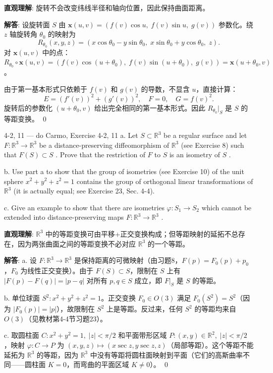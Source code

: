 \begin{solution}
\textbf{直观理解}: 旋转不会改变纬线半径和轴向位置，因此保持曲面距离。

\textbf{解答}: 设旋转面 $S$ 由 $\mathbf{x}(u,v) = (f(v)\cos u,\;f(v)\sin u,\;g(v))$ 参数化。绕 $z$ 轴旋转角 $\theta_0$ 的映射为
\[
R_{\theta_0}(x,y,z) = (x\cos\theta_0-y\sin\theta_0,\;x\sin\theta_0+y\cos\theta_0,\;z).
\]
对 $\mathbf{x}(u,v)$ 中的点：$R_{\theta_0}\circ\mathbf{x}(u,v) = (f(v)\cos(u+\theta_0),\;f(v)\sin(u+\theta_0),\;g(v)) = \mathbf{x}(u+\theta_0,v)$。

由于第一基本形式只依赖于 $f(v)$ 和 $g(v)$ 的导数，不显含 $u$，直接计算：
\[
E = (f'(v))^2+(g'(v))^2,\quad F=0,\quad G = f(v)^2.
\]
旋转后的参数化 $(u+\theta_0,v)$ 给出完全相同的第一基本形式。因此 $R_{\theta_0}|_S$ 是 $S$ 的等距变换。
\qed
\end{solution}

\begin{exercise}{4-2, 11 — do Carmo, Exercise 4-2, 11}
a. Let $S \subset \mathbb{R}^3$ be a regular surface and let $F \colon \mathbb{R}^3 \to \mathbb{R}^3$ be a distance-preserving diffeomorphism of $\mathbb{R}^3$ (see Exercise 8) such that $F(S) \subset S$ . Prove that the restriction of $F$ to $S$ is an isometry of $S$ .

b. Use part a to show that the group of isometries (see Exercise 10) of the unit sphere $x^{2} + y^{2} + z^{2} = 1$ contains the group of orthogonal linear transformations of $\mathbb{R}^3$ (it is actually equal; see Exercise 23, Sec. 4-4).

c. Give an example to show that there are isometries $\varphi \colon S_1 \to S_2$ which cannot be extended into distance-preserving maps $F \colon \mathbb{R}^3 \to \mathbb{R}^3$ .
\end{exercise}

\begin{solution}
\textbf{直观理解}: $\mathbb{R}^3$ 中的等距变换可由平移+正交变换构成；但等距映射的延拓不总存在，因为两张曲面之间的等距变换不必对应 $\mathbb{R}^3$ 的一个等距。

\textbf{解答}: a. 设 $F: \mathbb{R}^3\to\mathbb{R}^3$ 是保持距离的可微映射（由习题8，$F(p)=F_0(p)+p_0$，$F_0$ 为线性正交变换）。由于 $F(S)\subset S$，限制在 $S$ 上有 $|F(p)-F(q)| = |p-q|$ 对所有 $p,q\in S$ 成立，即 $F|_S$ 是 $S$ 的等距。

b. 单位球面 $S^2: x^2+y^2+z^2=1$。正交变换 $F_0\in O(3)$ 满足 $F_0(S^2)=S^2$（因为 $|F_0(p)|=|p|$），故限制在 $S^2$ 上是等距。反过来，任何 $S^2$ 的等距均来自 $O(3)$（见教材第4-4节习题23）。

c. 取圆柱面 $C: x^2+y^2=1,\;|z|<\pi/2$ 和平面带形区域 $P: (x,y)\in\mathbb{R}^2,\;|z|<\pi/2$，映射 $\varphi: C\to P$ 为 $(x,y,z)\mapsto (x\sec z,y\sec z,z)$（局部等距）。这个等距不能延拓为 $\mathbb{R}^3$ 的等距，因为 $\mathbb{R}^3$ 中没有等距将圆柱面映射到平面（它们的高斯曲率不同——圆柱面 $K=0$，而弯曲的平面区域 $K\neq 0$）。
\qed
\end{solution}

